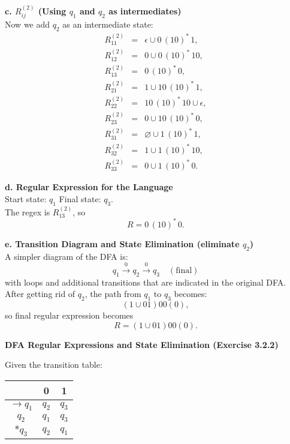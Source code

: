 \documentclass{article}
\theoremstyle{theorem}
\theoremstyle{definition}
\theoremstyle{remark}
\begin{document}
\textbf{c. \(R_{ij}^{(2)}\) (Using \(q_1\) and \(q_2\) as intermediates)}\\[1mm]
Now we add \(q_2\) as an intermediate state:
\[
\begin{array}{rcl}
R_{11}^{(2)} &=& \epsilon \cup 0\,(10)^*\,1,\\[1mm]
R_{12}^{(2)} &=& 0 \cup 0\,(10)^*\,10,\\[1mm]
R_{13}^{(2)} &=& 0\,(10)^*\,0,\\[1mm]
R_{21}^{(2)} &=& 1 \cup 10\,(10)^*\,1,\\[1mm]
R_{22}^{(2)} &=& 10\,(10)^*\,10 \cup \epsilon,\\[1mm]
R_{23}^{(2)} &=& 0 \cup 10\,(10)^*\,0,\\[1mm]
R_{31}^{(2)} &=& \varnothing \cup 1\,(10)^*\,1,\\[1mm]
R_{32}^{(2)} &=& 1 \cup 1\,(10)^*\,10,\\[1mm]
R_{33}^{(2)} &=& 0 \cup 1\,(10)^*\,0.
\end{array}
\]

\medskip

\textbf{d. Regular Expression for the Language}\\[1mm]
Start state: \(q_1\) \quad Final state: \(q_3\).\\[1mm]
The regex is \(R_{13}^{(2)}\), so
\[
R = 0\,(10)^*\,0.
\]

\medskip

\textbf{e. Transition Diagram and State Elimination (eliminate \(q_2\))}\\[1mm]
A simpler diagram of the DFA is:
\[
q_1 \xrightarrow{0} q_2 \xrightarrow{0} q_3\quad (\text{final})
\]
with loops and additional transitions that are indicated in the original DFA. After getting rid of \(q_2\), the path from \(q_1\) to \(q_3\) becomes:
\[
(1 \cup 01)00(0),
\]
so final regular expression becomes
\[
R = (1 \cup 01)00(0).
\]

\bigskip

\textbf{DFA Regular Expressions and State Elimination (Exercise 3.2.2)}

Given the transition table:
\begin{center}
\begin{tabular}{|c|c|c|}
\hline
       & 0   & 1   \\ \hline
$\rightarrow q_1$ & $q_2$ & $q_3$ \\ \hline
$q_2$ & $q_1$ & $q_3$ \\ \hline
$*q_3$ & $q_2$ & $q_1$ \\ \hline
\end{tabular}
\end{center}
\end{document}
